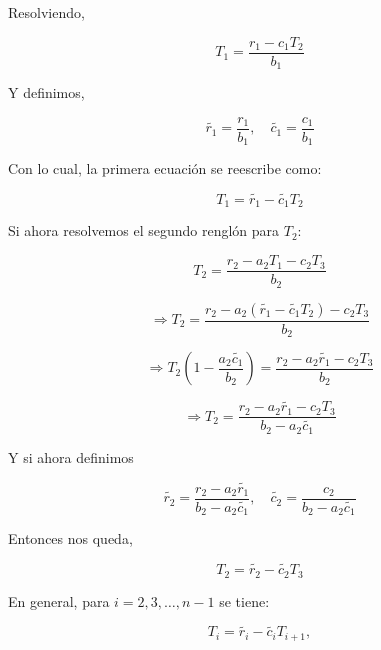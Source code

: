 \documentclass[11pt,a4paper]{article}
\begin{document}
Resolviendo,

\begin{equation}
T_1 = \frac{r_1 - c_1 T_2}{b_1}
\end{equation}

Y definimos,

\begin{equation}
\tilde{r_1} = \frac{r_1}{b_1}, \quad \tilde{c_1} = \frac{c_1}{b_1}
\end{equation}

Con lo cual, la primera ecuaci\'on se reescribe como:

\begin{equation}
T_1 = \tilde{r_1} - \tilde{c_1} T_2
\end{equation}

Si ahora resolvemos el segundo rengl\'on para $T_2$:

\begin{equation}
T_2 = \frac{r_2 - a_2 T_1 - c_2 T_3}{b_2}
\end{equation}

\begin{equation}
\Rightarrow T_2 = \frac{r_2 - a_2 (\tilde{r_1} - \tilde{c_1} T_2) - c_2 T_3}{b_2}
\end{equation}

\begin{equation}
\Rightarrow T_2 \left(1 - \frac{a_2 \tilde{c_1}}{b_2}\right) = \frac{r_2 - a_2 \tilde{r_1} - c_2 T_3}{b_2}
\end{equation}

\begin{equation}
\Rightarrow T_2 = \frac{r_2 - a_2 \tilde{r_1} - c_2 T_3}{b_2 - a_2 \tilde{c_1}}
\end{equation}

Y si ahora definimos 

\begin{equation}
\tilde{r_2} = \frac{r_2 - a_2 \tilde{r_1}}{b_2 - a_2 \tilde{c_1}}, \quad 
\tilde{c_2} = \frac{c_2}{b_2 - a_2 \tilde{c_1}}
\end{equation}

Entonces nos queda,

\begin{equation}
T_2 = \tilde{r_2} - \tilde{c_2} T_3
\end{equation}

En general, para $i=2,3,\ldots,n-1$ se tiene:

\begin{equation}
T_i = \tilde{r_i} - \tilde{c_i} T_{i+1},
\end{equation}
\end{document}
